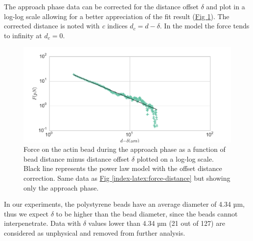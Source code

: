 \documentclass[A4paperpaper,11pt,english]{sphinxmanual}
\begin{document}
The approach phase data can be corrected for the distance offset \(\delta\)
and plot in a log-log scale allowing for a better appreciation of the fit
result (\hyperref[index-latex:force-distance-log-log]{Fig  \ref*{index-latex:force-distance-log-log}}). The corrected distance is noted with  \emph{c} indices \(d_c = d-
\delta\). In the model the force tends to infinity at \(d_c = 0\).
\begin{figure}[htbp]
\centering
\capstart

\includegraphics[width=0.800\linewidth]{force-distance-fit-loglog.pdf}
\caption{Force on the actin bead  during the approach phase as a function of bead distance
minus distance offset \(\delta\) plotted on a log-log scale. Black line
represents the power law model with the offset distance correction. Same
data as \hyperref[index-latex:force-distance]{Fig  \ref*{index-latex:force-distance}} but showing only the approach phase.}\label{index-latex:force-distance-log-log}\end{figure}

In our experiments, the polystyrene beads have an average diameter of 4.34 µm,
thus we expect \(\delta\) to be higher than the bead diameter, since the beads cannot interpenetrate.  Data with
\(\delta\) values lower than 4.34 µm (21 out of 127) are considered as
unphysical and removed from further analysis.
\end{document}
